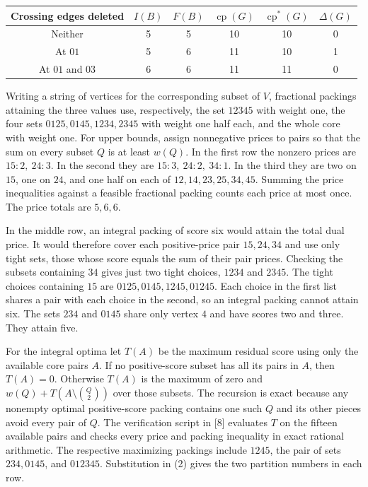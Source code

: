 \documentclass[english,11pt,a4paper]{article}
\newcounter{none}
\begin{document}
\begin{center}
\begin{tabular}{cccccc}
\toprule
Crossing edges deleted & $I(B)$ & $F(B)$ & $\operatorname{cp}(G)$ & $\operatorname{cp}^{\ast}(G)$ & $\Delta(G)$ \\
\midrule
Neither & 5 & 5 & 10 & 10 & 0 \\
At $01$ & 5 & 6 & 11 & 10 & 1 \\
At $01$ and $03$ & 6 & 6 & 11 & 11 & 0 \\
\bottomrule
\end{tabular}
\end{center}

Writing a string of vertices for the corresponding subset of \(V\), fractional packings attaining the three values use, respectively, the set \(12345\) with weight one, the four sets \(0125,0145,1234,2345\) with weight one half each, and the whole core with weight one. For upper bounds, assign nonnegative prices to pairs so that the sum on every subset \(Q\) is at least \(w(Q)\). In the first row the nonzero prices are \(15:2,\ 24:3\). In the second they are \(15:3,\ 24:2,\ 34:1\). In the third they are two on \(15\), one on \(24\), and one half on each of \(12,14,23,25,34,45\). Summing the price inequalities against a feasible fractional packing counts each price at most once. The price totals are \(5,6,6\).

In the middle row, an integral packing of score six would attain the total dual price. It would therefore cover each positive-price pair \(15,24,34\) and use only tight sets, those whose score equals the sum of their pair prices. Checking the subsets containing \(34\) gives just two tight choices, \(1234\) and \(2345\). The tight choices containing \(15\) are \(0125,0145,1245,01245\). Each choice in the first list shares a pair with each choice in the second, so an integral packing cannot attain six. The sets \(234\) and \(0145\) share only vertex \(4\) and have scores two and three. They attain five.

For the integral optima let \(T(A)\) be the maximum residual score using only the available core pairs \(A\). If no positive-score subset has all its pairs in \(A\), then \(T(A)=0\). Otherwise \(T(A)\) is the maximum of zero and \(w(Q)+T(A\setminus\binom Q2)\) over those subsets. The recursion is exact because any nonempty optimal positive-score packing contains one such \(Q\) and its other pieces avoid every pair of \(Q\). The verification script in {[}8{]} evaluates \(T\) on the fifteen available pairs and checks every price and packing inequality in exact rational arithmetic. The respective maximizing packings include \(1245\), the pair of sets \(234,0145\), and \(012345\). Substitution in (2) gives the two partition numbers in each row.
\end{document}
